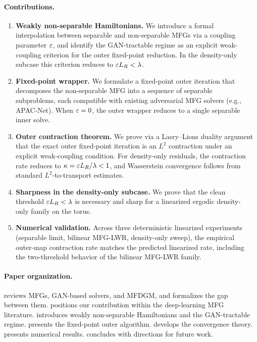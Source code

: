 \paragraph{Contributions.}
\begin{enumerate}
  \item \textbf{Weakly non-separable Hamiltonians.}
    We introduce a formal interpolation between separable and non-separable
    MFGs via a coupling parameter $\varepsilon$, and identify the GAN-tractable
    regime as an explicit weak-coupling criterion for the outer fixed-point
    reduction.  In the density-only subcase this criterion reduces to
    $\varepsilon L_R < \lambda$.

  \item \textbf{Fixed-point wrapper.}
    We formulate a fixed-point outer iteration that decomposes the
    non-separable MFG into a sequence of separable subproblems, each compatible
    with existing adversarial MFG solvers (e.g., APAC-Net).  When $\varepsilon=0$,
    the outer wrapper reduces to a single separable inner solve.

  \item \textbf{Outer contraction theorem.}
    We prove via a Lasry--Lions duality argument that the exact outer
    fixed-point iteration is an $L^2$ contraction under an explicit
    weak-coupling condition.  For density-only residuals, the contraction rate
    reduces to $\kappa=\varepsilon L_R/\lambda<1$, and Wasserstein convergence follows
    from standard $L^2$-to-transport estimates.

  \item \textbf{Sharpness in the density-only subcase.}
    We prove that the clean threshold $\varepsilon L_R < \lambda$ is necessary and
    sharp for a linearized ergodic density-only family on the torus.

  \item \textbf{Numerical validation.}
    Across three deterministic linearized experiments (separable limit,
    bilinear MFG-LWR, density-only sweep), the empirical outer-map contraction
    rate matches the predicted linearized rate, including the two-threshold
    behavior of the bilinear MFG-LWR family.
\end{enumerate}

\paragraph{Paper organization.}
 reviews MFGs, GAN-based solvers, and MFDGM, and
formalizes the gap between them.
 positions our contribution within the deep-learning MFG
literature.
 introduces weakly non-separable Hamiltonians and the
GAN-tractable regime.
 presents the fixed-point outer algorithm.
 develops the convergence theory.
 presents numerical results.
 concludes with directions for future work.
